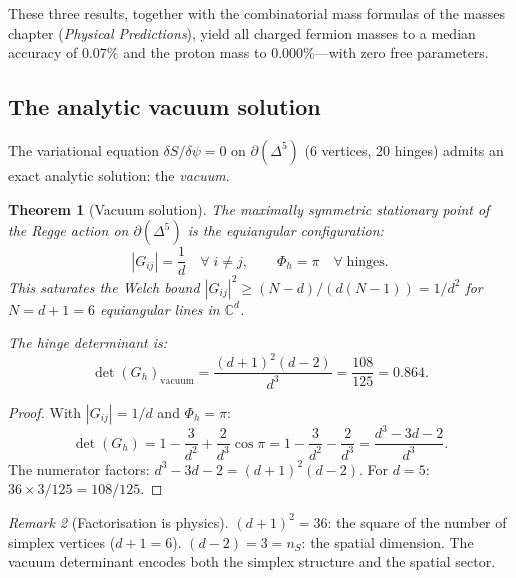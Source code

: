 \documentclass[12pt]{article}
\newtheorem{theorem}{Theorem}[section]
\theoremstyle{remark}
\newtheorem{remark}[theorem]{Remark}
\theoremstyle{definition}
\newcommand{\CC}{\mathbb{C}}
\begin{document}
These three results, together with the combinatorial mass formulas of
the masses chapter (\textit{Physical Predictions}), yield all charged fermion masses to a median
accuracy of $0.07\%$ and the proton mass to $0.000\%$---with zero
free parameters.

\subsection{The analytic vacuum solution}
\label{sec:vacuum_solution}

The variational equation $\delta S/\delta\psi = 0$ on $\partial(\Delta^5)$ (6 vertices, 20 hinges) admits an exact analytic solution: the \emph{vacuum}.

\begin{theorem}[Vacuum solution]
\label{thm:vacuum}
The maximally symmetric stationary point of the Regge action on $\partial(\Delta^5)$ is the equiangular configuration:
\begin{equation}
|G_{ij}| = \frac{1}{d} \quad \forall\; i \ne j, \qquad \Phi_h = \pi \quad \forall\;\text{hinges}.
\end{equation}
This saturates the Welch bound $|G_{ij}|^2 \ge (N-d)/(d(N-1)) = 1/d^2$ for $N = d+1 = 6$ equiangular lines in $\CC^d$.

The hinge determinant is:
\begin{equation}
\boxed{\det(G_h)_{\mathrm{vacuum}} = \frac{(d+1)^2(d-2)}{d^3} = \frac{108}{125} = 0.864.}
\end{equation}
\end{theorem}

\begin{proof}
With $|G_{ij}| = 1/d$ and $\Phi_h = \pi$:
\begin{equation}
\det(G_h) = 1 - \frac{3}{d^2} + \frac{2}{d^3}\cos\pi = 1 - \frac{3}{d^2} - \frac{2}{d^3} = \frac{d^3 - 3d - 2}{d^3}.
\end{equation}
The numerator factors: $d^3 - 3d - 2 = (d+1)^2(d-2)$.  For $d = 5$: $36 \times 3 / 125 = 108/125$.
\end{proof}

\begin{remark}[Factorisation is physics]
$(d+1)^2 = 36$: the square of the number of simplex vertices ($d+1 = 6$).  $(d-2) = 3 = n_S$: the spatial dimension.  The vacuum determinant encodes both the simplex structure and the spatial sector.
\end{remark}
\end{document}
